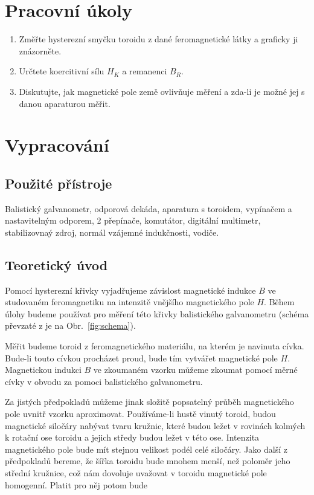 \documentclass[english]{article}
\begin{document}


\setlength{\parindent}{0.5cm}
\section{Pracovní úkoly}
\begin{enumerate}
\item Změřte hysterezní smyčku toroidu z dané feromagnetické látky a graficky ji znázorněte.

\item Určtete koercitivní sílu $H_K$ a remanenci $B_R$.

\item Diskutujte, jak magnetické pole země ovlivňuje měření a zda-li je možné jej s danou aparaturou měřit.
\end{enumerate}

	
\section{Vypracování}

	\subsection{Použité přístroje}
		Balistický galvanometr, odporová dekáda, aparatura s toroidem, vypínačem a nastavitelným odporem, 2 přepínače, komutátor, digitální multimetr, stabilizovnaý zdroj, normál vzájemné indukčnosti, vodiče.
	
	\subsection{Teoretický úvod}
		Pomocí hysterezní křivky vyjadřujeme závislost magnetické indukce $B$ ve studovaném feromagnetiku na intenzitě vnějšího magnetického pole $H$. Během úlohy budeme používat pro měření této křivky balistického galvanometru (schéma převzaté z \cite{bib:zadani} je na Obr.~\ref{fig:schema}). 
		
		Měřit budeme toroid z feromagnetického materiálu, na kterém je navinuta cívka. Bude-li touto cívkou procházet proud, bude tím vytvářet magnetické pole $H$. Magnetickou indukci $B$ ve zkoumaném vzorku můžeme zkoumat pomocí měrné cívky v obvodu za pomoci balistického galvanometru.  
		
		Za jistých předpokladů můžeme jinak složitě popsatelný průběh magnetického pole uvnitř vzorku aproximovat. Používáme-li hustě vinutý toroid, budou magnetické siločáry nabývat tvaru kružnic, které budou ležet v rovinách kolmých k rotační ose toroidu a jejich středy budou ležet v této ose. Intenzita magnetického pole bude mít stejnou velikost podél celé siločáry. Jako další z předpokladů bereme, že šířka toroidu bude mnohem menší, než poloměr jeho střední kružnice, což nám dovoluje uvažovat v toroidu magnetické pole homogenní. Platit pro něj potom bude
		
\end{document}
